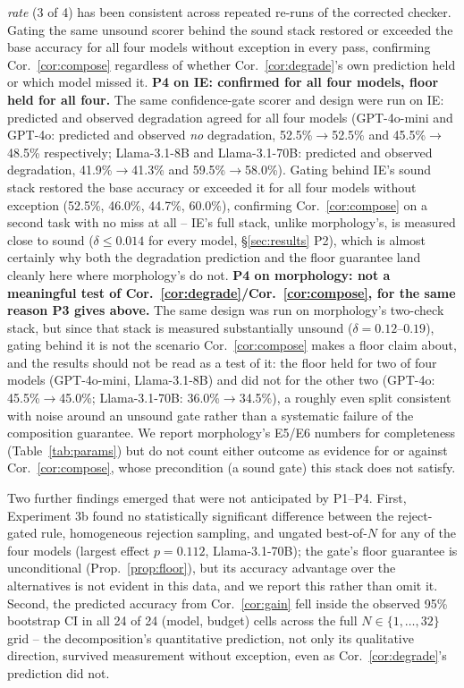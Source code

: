 \documentclass[11pt]{article}
\begin{document}
\emph{rate} (3 of 4) has been consistent across repeated re-runs of the corrected checker. Gating the same unsound scorer behind the sound stack restored or exceeded the base accuracy for all four models without exception in every pass, confirming Cor.~\ref{cor:compose} regardless of whether Cor.~\ref{cor:degrade}'s own prediction held or which model missed it. \textbf{P4 on IE: confirmed for all four models, floor held for all four.} The same confidence-gate scorer and design were run on IE: predicted and observed degradation agreed for all four models (GPT-4o-mini and GPT-4o: predicted and observed \emph{no} degradation, 52.5\%$\to$52.5\% and 45.5\%$\to$48.5\% respectively; Llama-3.1-8B and Llama-3.1-70B: predicted and observed degradation, 41.9\%$\to$41.3\% and 59.5\%$\to$58.0\%). Gating behind IE's sound stack restored the base accuracy or exceeded it for all four models without exception (52.5\%, 46.0\%, 44.7\%, 60.0\%), confirming Cor.~\ref{cor:compose} on a second task with no miss at all -- IE's full stack, unlike morphology's, is measured close to sound ($\delta\le0.014$ for every model, \S\ref{sec:results} P2), which is almost certainly why both the degradation prediction and the floor guarantee land cleanly here where morphology's do not. \textbf{P4 on morphology: not a meaningful test of Cor.~\ref{cor:degrade}/Cor.~\ref{cor:compose}, for the same reason P3 gives above.} The same design was run on morphology's two-check stack, but since that stack is measured substantially unsound ($\delta=0.12$--$0.19$), gating behind it is not the scenario Cor.~\ref{cor:compose} makes a floor claim about, and the results should not be read as a test of it: the floor held for two of four models (GPT-4o-mini, Llama-3.1-8B) and did not for the other two (GPT-4o: 45.5\%$\to$45.0\%; Llama-3.1-70B: 36.0\%$\to$34.5\%), a roughly even split consistent with noise around an unsound gate rather than a systematic failure of the composition guarantee. We report morphology's E5/E6 numbers for completeness (Table~\ref{tab:params}) but do not count either outcome as evidence for or against Cor.~\ref{cor:compose}, whose precondition (a sound gate) this stack does not satisfy. 

Two further findings emerged that were not anticipated by P1--P4. First, Experiment 3b found no statistically significant difference between the reject-gated rule, homogeneous rejection sampling, and ungated best-of-$N$ for any of the four models (largest effect $p=0.112$, Llama-3.1-70B); the gate's floor guarantee is unconditional (Prop.~\ref{prop:floor}), but its accuracy advantage over the alternatives is not evident in this data, and we report this rather than omit it. Second, the predicted accuracy from Cor.~\ref{cor:gain} fell inside the observed 95\% bootstrap CI in all 24 of 24 (model, budget) cells across the full $N\in\{1,\dots,32\}$ grid -- the decomposition's quantitative prediction, not only its qualitative direction, survived measurement without exception, even as Cor.~\ref{cor:degrade}'s prediction did not.
\end{document}
